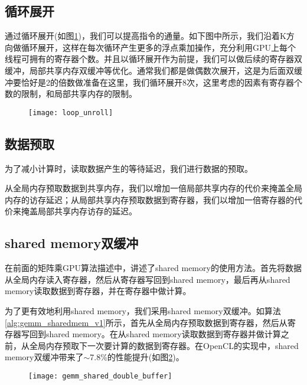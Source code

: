 \subsection{循环展开}
通过循环展开(如图\ref{fig:loop_unroll})，我们可以提高指令的通量。如下图中所示，我们沿着K方向做循环展开，这样在每次循环产生更多的浮点乘加操作，充分利用GPU上每个线程可拥有的寄存器个数。并且以循环展开作为前提，我们可以做后续的寄存器双缓冲，局部共享内存双缓冲等优化。通常我们都是做偶数次展开，这是为后面双缓冲要恰好是2的倍数做准备在这里，我们循环展开8次，这里考虑的因素有寄存器个数的限制，和局部共享内存的限制。

\begin{figure}[htbp]
	\centering
	\texttt{[image: loop\_unroll]}
	\label{fig:loop_unroll}
\end{figure}

\subsection{数据预取}
为了减小计算时，读取数据产生的等待延迟，我们进行数据的预取。

从全局内存预取数据到共享内存，我们以增加一倍局部共享内存的代价来掩盖全局内存的访存延迟；从局部共享内存预取数据到寄存器，我们以增加一倍寄存器的代价来掩盖局部共享内存访存的延迟。

\subsection{shared memory双缓冲}
在前面的矩阵乘GPU算法描述中，讲述了shared memory的使用方法。首先将数据从全局内存读入寄存器，然后从寄存器写回到shared memory，最后再从shared memory读取数据到寄存器，并在寄存器中做计算。

为了更有效地利用shared memory，我们采用shared memory双缓冲。如算法\ref{alg:gemm_sharedmem_v1}所示，首先从全局内存预取数据到寄存器，然后从寄存器写回到shared memory。在从shared memory读取数据到寄存器并做计算之前，从全局内存预取下一次要计算的数据到寄存器。在OpenCL的实现中，shared memory双缓冲带来了$\sim$7.8\%的性能提升(如图\ref{fig:gemm_shared_double_buffer})。
\begin{figure}[htbp]
	\centering
	\texttt{[image: gemm\_shared\_double\_buffer]}
	\label{fig:gemm_shared_double_buffer}
\end{figure}

